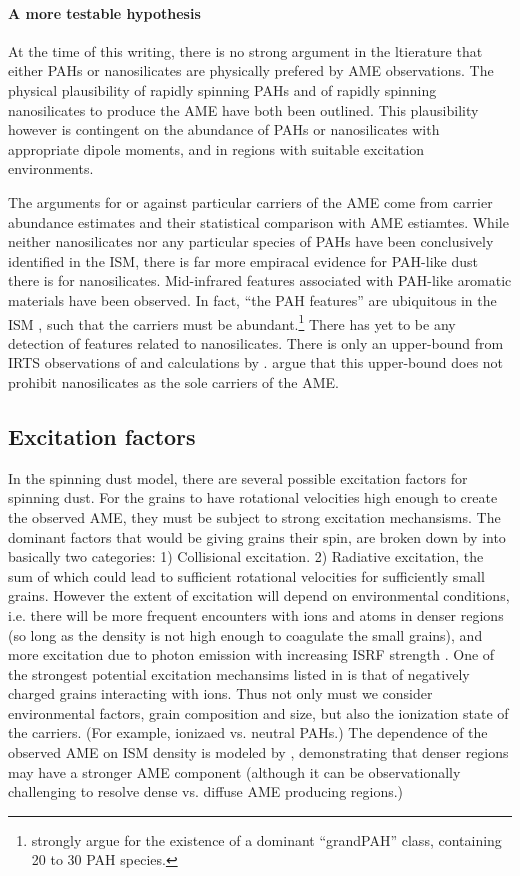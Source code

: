        \paragraph{A more testable hypothesis}
         At the time of this writing, there is no strong argument in the ltierature that either PAHs or nanosilicates are physically prefered by AME observations. The physical plausibility of rapidly spinning PAHs and of rapidly spinning nanosilicates to produce the AME have both been outlined. This plausibility however is contingent on the abundance of PAHs or nanosilicates with appropriate dipole moments, and in regions with suitable excitation environments.

         The arguments for or against particular carriers of the AME come from carrier abundance estimates and their statistical comparison with AME estiamtes. While neither nanosilicates nor any particular species of PAHs have been conclusively identified in the ISM, there is far more empiracal evidence for PAH-like dust there is for nanosilicates. Mid-infrared features associated with PAH-like aromatic materials have been observed. In fact, ``the PAH features'' are ubiquitous in the ISM \citep{giard94,onaka96,onaka00}, such that the carriers must be abundant.\footnote{ \cite{andrews15} strongly argue for the  existence of a dominant ``grandPAH'' class, containing 20 to 30 PAH species.} There has yet to be any detection of features related to nanosilicates. There is only an upper-bound from IRTS observations of \cite{onaka96} and calculations by \cite{li01}. \cite{hensley17a} argue that this upper-bound does not prohibit nanosilicates as the sole carriers of the AME.

     \subsection{Excitation factors}
       In the spinning dust model, there are several possible excitation factors for spinning dust. For the grains to have rotational velocities high enough to create the observed AME, they must be subject to strong excitation mechansisms. The dominant factors that would be giving grains their spin, are broken down by \cite{draine11} into basically two categories: 1) Collisional excitation. 2) Radiative excitation, the sum of which could lead to sufficient rotational velocities for sufficiently small grains. However the extent of excitation will depend on environmental conditions, i.e. there will be more frequent encounters with ions and atoms in denser regions (so long as the density is not high enough to coagulate the small grains), and more excitation due to photon emission with increasing ISRF strength \citep{ali-haimoud09, ali-haimoud14}. One of the strongest potential excitation mechansims listed in \cite{draine11} is that of negatively charged grains interacting with ions. Thus not only must we consider environmental factors, grain composition and size, but also the ionization state of the carriers. (For example, ionizaed vs. neutral PAHs.) The dependence of the observed AME on ISM density is modeled by \cite{ali-haimoud10}, demonstrating that denser regions may have a stronger AME component (although it can be observationally challenging to resolve dense vs. diffuse AME producing regions.)

